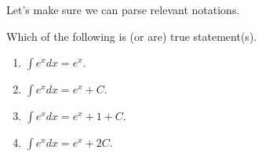\documentclass[../main.tex]{subfiles}
\begin{document}
  Let's make sure we can parse relevant notations. 
  \begin{example}
    Which of the following is (or are) true statement(s).
    \begin{enumerate}[label=(\alph*)]
      \item \(\int e^{x} dx = e^{x}\).
      \item \(\int e^{x} dx = e^{x} + C\).
      \item \(\int e^{x} dx = e^{x} + 1 + C\).
      \item \(\int e^{x} dx = e^{x} + 2C\).
    \end{enumerate}
  \end{example}


\end{document}
